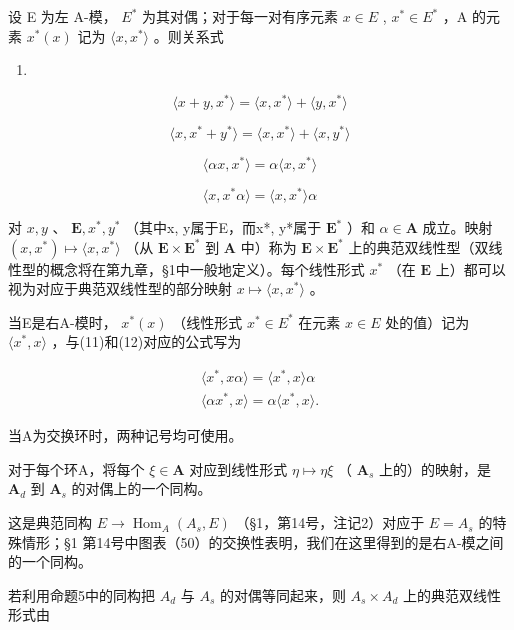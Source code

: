 设 E 为左 A-模， \(E^{*}\) 为其对偶；对于每一对有序元素 \(x \in E\) , \(x^{*} \in E^{*}\) ，A 的元素 \(x^{*}(x)\) 记为 \(\langle x, x^{*} \rangle\) 。则关系式

\begin{enumerate}
\def\labelenumi{(\arabic{enumi})}
\setcounter{enumi}{8}
\tightlist
\item
\end{enumerate}

\[
\langle x + y, x ^ {*} \rangle = \langle x, x ^ {*} \rangle + \langle y, x ^ {*} \rangle\tag{10}
\]

\[
\langle x, x ^ {*} + y ^ {*} \rangle = \langle x, x ^ {*} \rangle + \langle x, y ^ {*} \rangle\tag{11}
\]

\[
\langle \alpha x, x ^ {*} \rangle = \alpha \langle x, x ^ {*} \rangle\tag{12}
\]

\[
\langle x, x ^ {*} \alpha \rangle = \langle x, x ^ {*} \rangle \alpha
\]

对 \(x, y\) 、 \(\mathbf{E}, x^*, y^*\) （其中x, y属于E，而x*, y*属于 \(\mathbf{E}^*\) ）和 \(\alpha \in \mathbf{A}\) 成立。映射 \((x, x^*) \mapsto \langle x, x^* \rangle\) （从 \(\mathbf{E} \times \mathbf{E}^*\) 到 \(\mathbf{A}\) 中）称为 \(\mathbf{E} \times \mathbf{E}^*\) 上的典范双线性型（双线性型的概念将在第九章，§1中一般地定义）。每个线性形式 \(x^*\) （在 \(\mathbf{E}\) 上）都可以视为对应于典范双线性型的部分映射 \(x \mapsto \langle x, x^* \rangle\) 。

当E是右A-模时， \(x^{*}(x)\) （线性形式 \(x^{*} \in E^{*}\) 在元素 \(x \in E\) 处的值）记为 \(\langle x^{*}, x \rangle\) ，与(11)和(12)对应的公式写为

\[
\begin{array}{l} \langle x ^ {*}, x \alpha \rangle = \langle x ^ {*}, x \rangle \alpha \\ \langle \alpha x ^ {*}, x \rangle = \alpha \langle x ^ {*}, x \rangle . \end{array}
\]

当A为交换环时，两种记号均可使用。

对于每个环A，将每个 \(\xi\in\mathbf{A}\) 对应到线性形式 \(\eta\mapsto\eta\xi\) （ \(\mathbf{A}_{s}\) 上的）的映射，是 \(\mathbf{A}_{d}\) 到 \(\mathbf{A}_{s}\) 的对偶上的一个同构。

这是典范同构 \(E \to \operatorname{Hom}_{A}(A_{s}, E)\) （§1，第14号，注记2）对应于 \(E = A_{s}\) 的特殊情形；§1 第14号中图表（50）的交换性表明，我们在这里得到的是右A-模之间的一个同构。

若利用命题5中的同构把 \(A_{d}\) 与 \(A_{s}\) 的对偶等同起来，则 \(A_{s} \times A_{d}\) 上的典范双线性形式由

